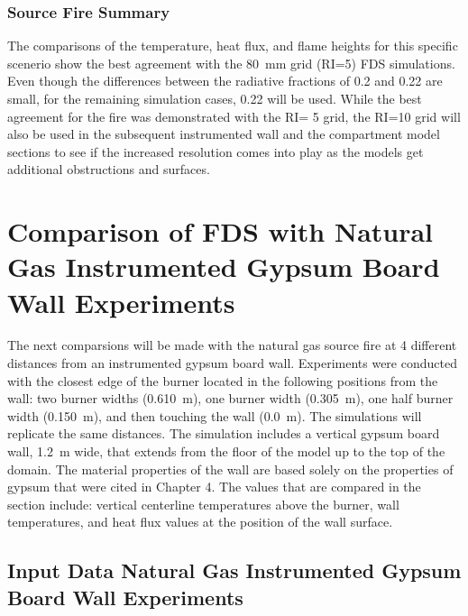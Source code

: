 \documentclass[twoside]{uocthesis}
\begin{document}
{\subsubsection{Source Fire Summary}

The comparisons of the temperature, heat flux, and flame heights for this specific scenerio show the best agreement with the 80~mm grid (RI=5) FDS simulations.  Even though the differences between the radiative fractions of 0.2 and 0.22 are small, for the remaining simulation cases, 0.22 will be used.  While the best agreement for the fire was demonstrated with the RI= 5 grid, the RI=10 grid will also be used in the subsequent instrumented wall and the compartment model sections to see if the increased resolution comes into play as the models get additional obstructions and surfaces.  

\section{Comparison of FDS with Natural Gas Instrumented Gypsum Board Wall Experiments}

The next comparsions will be made with the natural gas source fire at 4 different distances from an instrumented gypsum board wall.  Experiments were conducted with the closest edge of the burner located in the following positions from the wall: two burner widths (0.610~m), one burner width (0.305~m), one half burner width (0.150~m), and then touching the wall (0.0~m).  The simulations will replicate the same distances.  The simulation includes a vertical gypsum board wall, 1.2~m wide, that extends from the floor of the model up to the top of the domain.  The material properties of the wall are based solely on the properties of gypsum that were cited in Chapter 4.  The values that are compared in the section include: vertical centerline temperatures above the burner, wall temperatures, and heat flux values at the position of the wall surface.    
 
\subsection{Input Data Natural Gas Instrumented Gypsum Board Wall Experiments}

}
\end{document}
